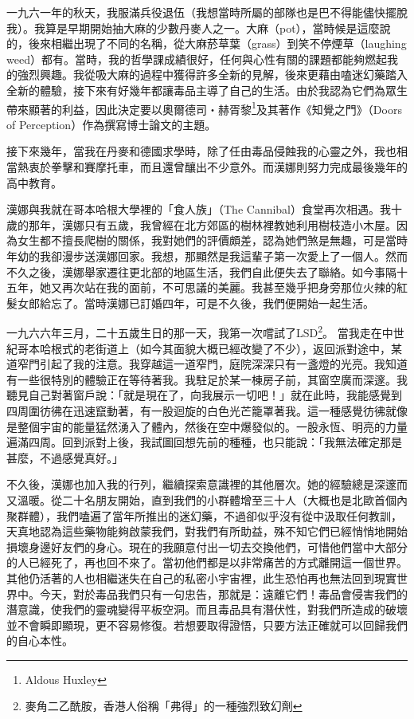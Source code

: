 一九六一年的秋天，我服滿兵役退伍（我想當時所屬的部隊也是巴不得能儘快擺脫我）。我算是早期開始抽大麻的少數丹麥人之一。大麻（pot），當時候是這麼說的，後來相繼出現了不同的名稱，從大麻菸草葉（grass）到笑不停煙草（laughing
weed）都有。當時，我的哲學課成績很好，任何與心性有關的課題都能夠燃起我的強烈興趣。我從吸大麻的過程中獲得許多全新的見解，後來更藉由嗑迷幻藥踏入全新的體驗，接下來有好幾年都讓毒品主導了自己的生活。由於我認為它們為眾生帶來顯著的利益，因此決定要以奧爾德司‧赫胥黎\footnote{Aldous
Huxley}及其著作《知覺之門》（Doors of
Perception）作為撰寫博士論文的主題。

接下來幾年，當我在丹麥和德國求學時，除了任由毒品侵蝕我的心靈之外，我也相當熱衷於拳擊和賽摩托車，而且還曾釀出不少意外。而漢娜則努力完成最後幾年的高中教育。

漢娜與我就在哥本哈根大學裡的「食人族」（The
Cannibal）食堂再次相遇。我十歲的那年，漢娜只有五歲，我曾經在北方郊區的樹林裡教她利用樹枝造小木屋。因為女生都不擅長爬樹的關係，我對她們的評價頗差，認為她們煞是無趣，可是當時年幼的我卻漫步送漢娜回家。我想，那顯然是我這輩子第一次愛上了一個人。然而不久之後，漢娜舉家遷往更北部的地區生活，我們自此便失去了聯絡。如今事隔十五年，她又再次站在我的面前，不可思議的美麗。我甚至幾乎把身旁那位火辣的紅髮女郎給忘了。當時漢娜已訂婚四年，可是不久後，我們便開始一起生活。

一九六六年三月，二十五歲生日的那一天，我第一次嚐試了LSD\footnote{麥角二乙酰胺，香港人俗稱「弗得」的一種強烈致幻劑}。
當我走在中世紀哥本哈根式的老街道上（如今其面貌大概已經改變了不少），返回派對途中，某道窄門引起了我的注意。我穿越這一道窄門，庭院深深只有一盞燈的光亮。我知道有一些很特別的體驗正在等待著我。我駐足於某一棟房子前，其窗空廣而深邃。我聽見自己對著窗戶說：「就是現在了，向我展示一切吧！」就在此時，我能感覺到四周圍彷彿在迅速竄動著，有一股迴旋的白色光芒籠罩著我。這一種感覺彷彿就像是整個宇宙的能量猛然湧入了體內，然後在空中爆發似的。一股永恆、明亮的力量遍滿四周。回到派對上後，我試圖回想先前的種種，也只能說：「我無法確定那是甚麼，不過感覺真好。」

不久後，漢娜也加入我的行列，繼續探索意識裡的其他層次。她的經驗總是深邃而又溫暖。從二十名朋友開始，直到我們的小群體增至三十人（大概也是北歐首個內聚群體），我們嗑遍了當年所推出的迷幻藥，不過卻似乎沒有從中汲取任何教訓，天真地認為這些藥物能夠啟蒙我們，對我們有所助益，殊不知它們已經悄悄地開始損壞身邊好友們的身心。現在的我願意付出一切去交換他們，可惜他們當中大部分的人已經死了，再也回不來了。當初他們都是以非常痛苦的方式離開這一個世界。其他仍活著的人也相繼迷失在自己的私密小宇宙裡，此生恐怕再也無法回到現實世界中。今天，對於毒品我們只有一句忠告，那就是：遠離它們！毒品會侵害我們的潛意識，使我們的靈魂變得平板空洞。而且毒品具有潛伏性，對我們所造成的破壞並不會瞬即顯現，更不容易修復。若想要取得證悟，只要方法正確就可以回歸我們的自心本性。

